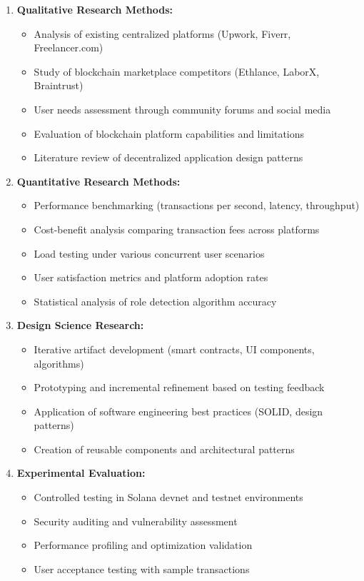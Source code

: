 \documentclass[a4paper,13pt,twoside]{report}
\theoremstyle{definition}
\begin{document}
\begin{enumerate}
    \item \textbf{Qualitative Research Methods:}
    \begin{itemize}
        \item Analysis of existing centralized platforms (Upwork, Fiverr, Freelancer.com)
        \item Study of blockchain marketplace competitors (Ethlance, LaborX, Braintrust)
        \item User needs assessment through community forums and social media
        \item Evaluation of blockchain platform capabilities and limitations
        \item Literature review of decentralized application design patterns
    \end{itemize}

    \item \textbf{Quantitative Research Methods:}
    \begin{itemize}
        \item Performance benchmarking (transactions per second, latency, throughput)
        \item Cost-benefit analysis comparing transaction fees across platforms
        \item Load testing under various concurrent user scenarios
        \item User satisfaction metrics and platform adoption rates
        \item Statistical analysis of role detection algorithm accuracy
    \end{itemize}

    \item \textbf{Design Science Research:}
    \begin{itemize}
        \item Iterative artifact development (smart contracts, UI components, algorithms)
        \item Prototyping and incremental refinement based on testing feedback
        \item Application of software engineering best practices (SOLID, design patterns)
        \item Creation of reusable components and architectural patterns
    \end{itemize}

    \item \textbf{Experimental Evaluation:}
    \begin{itemize}
        \item Controlled testing in Solana devnet and testnet environments
        \item Security auditing and vulnerability assessment
        \item Performance profiling and optimization validation
        \item User acceptance testing with sample transactions
    \end{itemize}
\end{enumerate}
\end{document}
